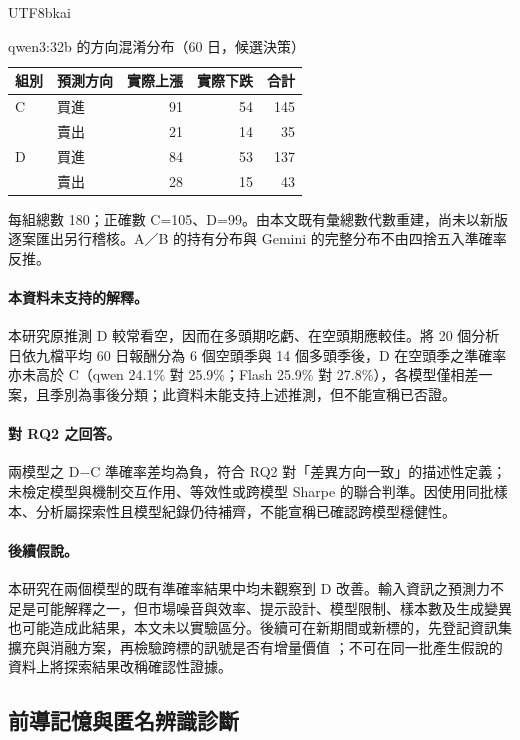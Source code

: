 \documentclass[12pt,a4paper]{article}
\newcommand{\grp}[1]{\textsf{#1}}
\begin{document}
\begin{CJK}{UTF8}{bkai}
\begin{table}[H]
\centering\small
\caption{qwen3:32b 的方向混淆分布（60 日，候選決策）}
\label{tab:confusion}
\begin{tabular}{@{}llrrr@{}}
\toprule
組別 & 預測方向 & 實際上漲 & 實際下跌 & 合計 \\
\midrule
\grp{C} & 買進 & 91 & 54 & 145 \\
         & 賣出 & 21 & 14 & 35 \\
\grp{D} & 買進 & 84 & 53 & 137 \\
         & 賣出 & 28 & 15 & 43 \\
\bottomrule
\end{tabular}
\par\smallskip
\raggedright\footnotesize 每組總數 180；正確數 C=105、D=99。由本文既有彙總數代數重建，尚未以新版逐案匯出另行稽核。A／B 的持有分布與 Gemini 的完整分布不由四捨五入準確率反推。
\end{table}

\paragraph{本資料未支持的解釋。} 本研究原推測 \grp{D} 較常看空，因而在多頭期吃虧、在空頭期應較佳。將 20 個分析日依九檔平均 60 日報酬分為 6 個空頭季與 14 個多頭季後，\grp{D} 在空頭季之準確率亦未高於 \grp{C}（qwen 24.1\% 對 25.9\%；Flash 25.9\% 對 27.8\%），各模型僅相差一案，且季別為事後分類；此資料未能支持上述推測，但不能宣稱已否證。

\paragraph{對 RQ2 之回答。} 兩模型之 \grp{D}$-$\grp{C} 準確率差均為負，符合 RQ2 對「差異方向一致」的描述性定義；未檢定模型與機制交互作用、等效性或跨模型 Sharpe 的聯合判準。因使用同批樣本、分析屬探索性且模型紀錄仍待補齊，不能宣稱已確認跨模型穩健性。

\paragraph{後續假說。} 本研究在兩個模型的既有準確率結果中均未觀察到 \grp{D} 改善。輸入資訊之預測力不足是可能解釋之一，但市場噪音與效率、提示設計、模型限制、樣本數及生成變異也可能造成此結果，本文未以實驗區分。後續可在新期間或新標的，先登記資訊集擴充與消融方案，再檢驗跨標的訊號是否有增量價值 \citep{nosek2018prereg}；不可在同一批產生假說的資料上將探索結果改稱確認性證據。

\subsection{前導記憶與匿名辨識診斷}
\label{sec:memorydiagnostic}


\end{CJK}
\end{document}
